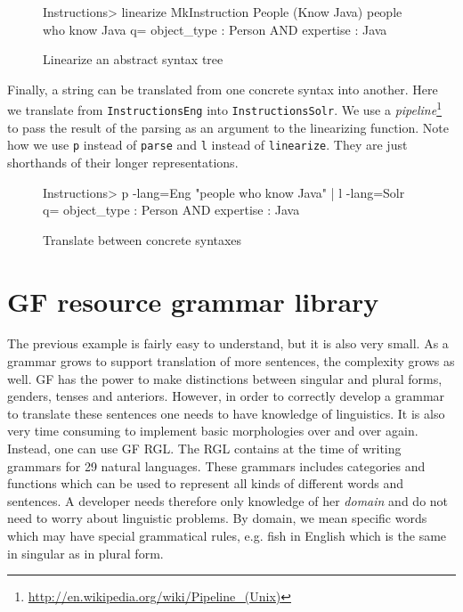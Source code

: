 \begin{figure}[H]
\begin{terminal}
Instructions> linearize MkInstruction People (Know Java)
people who know Java
q= object_type : Person AND expertise : Java
\end{terminal}

\caption{Linearize an abstract syntax tree\label{fig:linearization}}
\end{figure}

Finally, a string can be translated from one concrete syntax into another. Here we translate from \texttt{InstructionsEng} into \texttt{InstructionsSolr}. We use a \emph{pipeline}\footnote{\url{http://en.wikipedia.org/wiki/Pipeline_(Unix)}} to pass the result of the parsing as an argument to the linearizing function. Note how we use \texttt{p} instead of \texttt{parse} and \texttt{l} instead of \texttt{linearize}. They are just shorthands of their longer representations.

\begin{figure}[H]
\begin{terminal}
Instructions> p -lang=Eng "people who know Java" | l -lang=Solr
q= object_type : Person AND expertise : Java
\end{terminal}
\caption{Translate between concrete syntaxes\label{fig:translation-concr}}
\end{figure}


\section{GF resource grammar library}

The previous example is fairly easy to understand, but it is also very small. As a grammar grows to support translation of more sentences, the complexity grows as well. GF has the power to make distinctions between singular and plural forms, genders, tenses and anteriors. However, in order to correctly develop a grammar to translate these sentences one needs to have knowledge of linguistics. It is also very time consuming to implement basic morphologies over and over again. Instead, one can use GF \ac{RGL}. The RGL contains at the time of writing grammars for 29 natural languages. These grammars includes categories and functions which can be used to represent all kinds of different words and sentences. A developer needs therefore only knowledge of her \emph{domain} and do not need to worry about linguistic problems. By domain, we mean specific words which may have special grammatical rules, e.g. fish in English which is the same in singular as in plural form.

